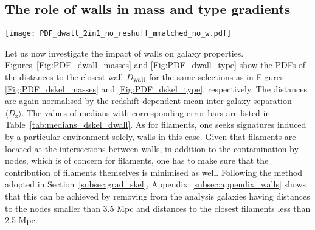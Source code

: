 \documentclass[useAMS,usenatbib]{mnras}
\begin{document}
\subsection{The role of walls in mass and type gradients}
\label{subsec:grad_wall}

\begin{figure*}
\texttt{[image: PDF\_dwall\_2in1\_no\_reshuff\_mmatched\_no\_w.pdf]}
\caption{\textit{Top row:} As in Figure~\ref{Fig:PDF_dskel_masses}, but for the distances to the nearest wall, $D_{\mathrm{wall}}$.
To minimise the contribution of nodes and filaments to the measured signal, galaxies located closer to a node than 3.5 Mpc and closer to a filament than 2.5 Mpc are removed form the analysis. 
There is a mass segregation of galaxies with respect to walls of the entire as well as star-forming population: more massive galaxies tend to be preferentially located closer to the filaments compared to their lower-mass counterparts.
\textit{Bottom row:} Residuals in units of $\sigma$ as in Figure~\ref{Fig:PDF_dskel_masses}. 
}
\label{Fig:PDF_dwall_masses}
\end{figure*}


Let us now investigate the impact of walls on galaxy properties. Figures~\ref{Fig:PDF_dwall_masses} and \ref{Fig:PDF_dwall_type} show the PDFs of the distances to the closest wall $D_{\rm wall}$ for the same selections as in Figures \ref{Fig:PDF_dskel_masses} and \ref{Fig:PDF_dskel_type}, respectively.
The distances are again normalised by the redshift dependent mean inter-galaxy separation $\langle D_{\mathrm{z}} \rangle$. The values of medians with corresponding error bars are listed in Table~\ref{tab:medians_dskel_dwall}. 
As for filaments, one seeks signatures induced by a particular environment solely, walls in this case.  
Given that filaments are located at the intersections between walls, in addition to the contamination by nodes, which is of concern for filaments, one has to make sure that the contribution of filaments themselves %
is minimised as well. Following the method adopted in Section~\ref{subsec:grad_skel}, Appendix~\ref{subsec:appendix_walls} shows that this can be achieved by removing from the analysis galaxies having distances to the nodes smaller than 3.5 Mpc and distances to the closest filaments less than 2.5 Mpc.   
\end{document}
